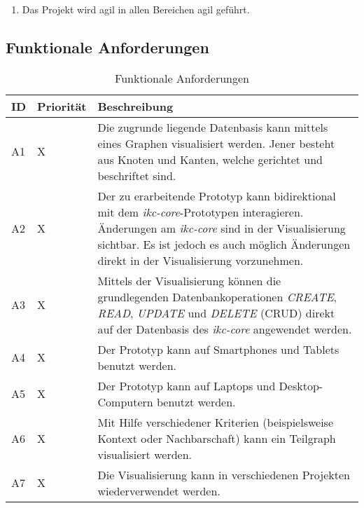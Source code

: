 \begin{enumerate}
    \item Das Projekt wird agil in allen Bereichen agil geführt.
\end{enumerate}

\subsection{Funktionale Anforderungen}

\begin{table}
  \centering
  \begin{tabular}{|p{0.6cm} | p{1.6cm} | p{8cm}|}
  \hline
    ID & Priorität & Beschreibung \\\hline
    A1 & X & Die zugrunde liegende Datenbasis kann mittels eines Graphen visualisiert werden. Jener besteht aus Knoten und Kanten, welche gerichtet und beschriftet sind.\\\hline
    A2 & X & Der zu erarbeitende Prototyp kann bidirektional mit dem \textit{ikc-core}-Prototypen interagieren. Änderungen am \textit{ikc-core} sind in der Visualisierung sichtbar. Es ist jedoch es auch möglich Änderungen direkt in der Visualisierung vorzunehmen.\\\hline
    A3 & X & Mittels der Visualisierung können die grundlegenden Datenbankoperationen \textit{CREATE}, \textit{READ}, \textit{UPDATE} und \textit{DELETE} (CRUD) direkt auf der Datenbasis des \textit{ikc-core} angewendet werden.\\\hline
    A4 & X & Der Prototyp kann auf Smartphones und Tablets benutzt werden.\\\hline
    A5 & X & Der Prototyp kann auf Laptops und Desktop-Computern benutzt werden.\\\hline    
    A6 & X & Mit Hilfe verschiedener Kriterien (beispielsweise Kontext oder Nachbarschaft) kann ein Teilgraph visualisiert werden.\\\hline 
    A7 & X & Die Visualisierung kann in verschiedenen Projekten wiederverwendet werden.\\\hline     
     
  \end{tabular}
    \caption{Funktionale Anforderungen}
  \label{tab:funktionale-anforderungen}
\end{table}

